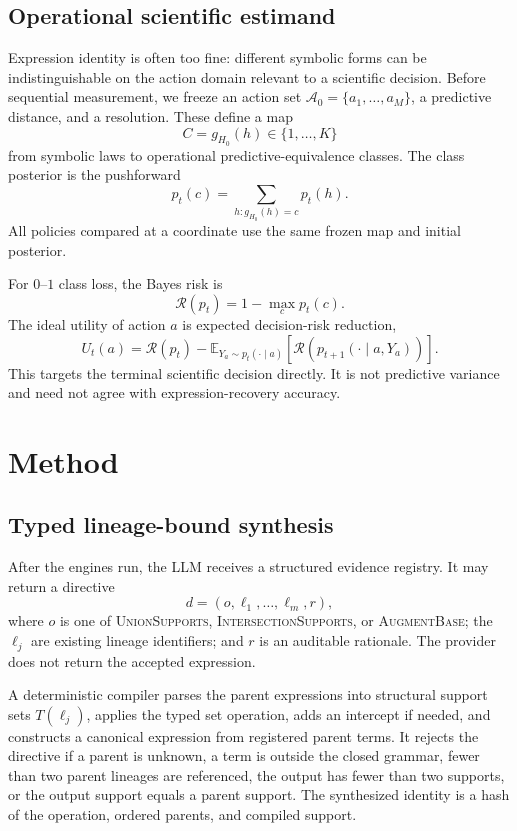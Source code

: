 \documentclass[twoside]{article}
\newcommand{\E}{\mathbb E}
\newcommand{\R}{\mathcal R}
\newcommand{\Acal}{\mathcal A}
\begin{document}
\subsection{Operational scientific estimand}

Expression identity is often too fine: different symbolic forms can be
indistinguishable on the action domain relevant to a scientific decision.
Before sequential measurement, we freeze an action set
\(\Acal_0=\{a_1,\ldots,a_M\}\), a predictive distance, and a resolution.
These define a map
\[
 C=g_{H_0}(h)\in\{1,\ldots,K\}
\]
from symbolic laws to operational predictive-equivalence classes. The class
posterior is the pushforward
\[
 p_t(c)=\sum_{h:g_{H_0}(h)=c}p_t(h).
\]
All policies compared at a coordinate use the same frozen map and initial
posterior.

For \(0\)--\(1\) class loss, the Bayes risk is
\[
 \R(p_t)=1-\max_c p_t(c).
\]
The ideal utility of action \(a\) is expected decision-risk reduction,
\begin{equation}
 U_t(a)=\R(p_t)-
 \E_{Y_a\sim p_t(\cdot\mid a)}
 \left[\R\!\left(p_{t+1}(\cdot\mid a,Y_a)\right)\right].
 \label{eq:riskutility}
\end{equation}
This targets the terminal scientific decision directly. It is not predictive
variance and need not agree with expression-recovery accuracy.

\section{Method}

\subsection{Typed lineage-bound synthesis}

After the engines run, the LLM receives a structured evidence registry. It may
return a directive
\[
 d=(o,\ell_1,\ldots,\ell_m,r),
\]
where \(o\) is one of \textsc{UnionSupports},
\textsc{IntersectionSupports}, or \textsc{AugmentBase}; the \(\ell_j\) are
existing lineage identifiers; and \(r\) is an auditable rationale. The
provider does not return the accepted expression.

A deterministic compiler parses the parent expressions into structural
support sets \(T(\ell_j)\), applies the typed set operation, adds an intercept
if needed, and constructs a canonical expression from registered parent
terms. It rejects the directive if a parent is unknown, a term is outside the
closed grammar, fewer than two parent lineages are referenced, the output has
fewer than two supports, or the output support equals a parent support.
The synthesized identity is a hash of the operation, ordered parents, and
compiled support.
\end{document}
